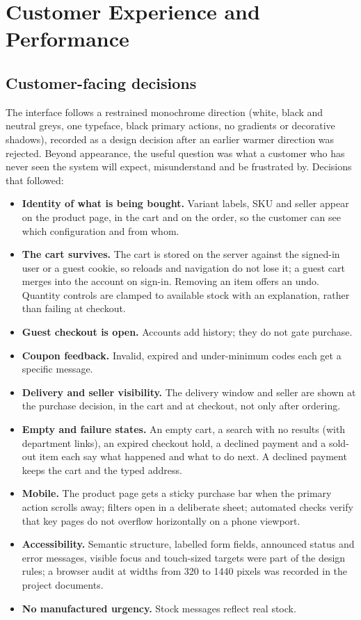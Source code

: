 \chapter{Customer Experience and Performance}
\label{ch:ux}

\section{Customer-facing decisions}

The interface follows a restrained monochrome direction (white, black and neutral greys, one typeface, black primary actions, no gradients or decorative shadows), recorded as a design decision after an earlier warmer direction was rejected. Beyond appearance, the useful question was what a customer who has never seen the system will expect, misunderstand and be frustrated by. Decisions that followed:

\begin{itemize}
\item \textbf{Identity of what is being bought.} Variant labels, SKU and seller appear on the product page, in the cart and on the order, so the customer can see which configuration and from whom.
\item \textbf{The cart survives.} The cart is stored on the server against the signed-in user or a guest cookie, so reloads and navigation do not lose it; a guest cart merges into the account on sign-in. Removing an item offers an undo. Quantity controls are clamped to available stock with an explanation, rather than failing at checkout.
\item \textbf{Guest checkout is open.} Accounts add history; they do not gate purchase.
\item \textbf{Coupon feedback.} Invalid, expired and under-minimum codes each get a specific message.
\item \textbf{Delivery and seller visibility.} The delivery window and seller are shown at the purchase decision, in the cart and at checkout, not only after ordering.
\item \textbf{Empty and failure states.} An empty cart, a search with no results (with department links), an expired checkout hold, a declined payment and a sold-out item each say what happened and what to do next. A declined payment keeps the cart and the typed address.
\item \textbf{Mobile.} The product page gets a sticky purchase bar when the primary action scrolls away; filters open in a deliberate sheet; automated checks verify that key pages do not overflow horizontally on a phone viewport.
\item \textbf{Accessibility.} Semantic structure, labelled form fields, announced status and error messages, visible focus and touch-sized targets were part of the design rules; a browser audit at widths from 320 to 1440 pixels was recorded in the project documents.
\item \textbf{No manufactured urgency.} Stock messages reflect real stock.
\end{itemize}

